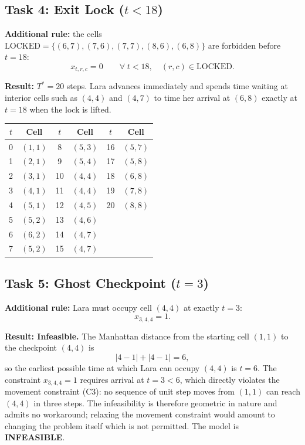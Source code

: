 \documentclass[12pt,a4paper]{article}
\begin{document}
\subsection*{Task 4: Exit Lock ($t<18$)}

\textbf{Additional rule:} the cells
$\mathrm{LOCKED}=\{(6,7),(7,6),(7,7),(8,6),(6,8)\}$
are forbidden before $t=18$:
\[
  x_{t,r,c}=0 \qquad \forall\;t<18,\quad(r,c)\in\mathrm{LOCKED}.
\]

\textbf{Result:} $T^*=20$ steps. Lara advances immediately and spends time waiting at
interior cells such as $(4,4)$ and $(4,7)$ to time her arrival at $(6,8)$ exactly at
$t=18$ when the lock is lifted.

\begin{center}
\begin{tabular}{cc|cc|cc}
\toprule
$t$ & Cell & $t$ & Cell & $t$ & Cell \\
\midrule
 0 & $(1,1)$ &  8 & $(5,3)$ & 16 & $(5,7)$ \\
 1 & $(2,1)$ &  9 & $(5,4)$ & 17 & $(5,8)$ \\
 2 & $(3,1)$ & 10 & $(4,4)$ & 18 & $(6,8)$ \\
 3 & $(4,1)$ & 11 & $(4,4)$ & 19 & $(7,8)$ \\
 4 & $(5,1)$ & 12 & $(4,5)$ & 20 & $(8,8)$ \\
 5 & $(5,2)$ & 13 & $(4,6)$ &    & \\
 6 & $(6,2)$ & 14 & $(4,7)$ &    & \\
 7 & $(5,2)$ & 15 & $(4,7)$ &    & \\
\bottomrule
\end{tabular}
\end{center}

\subsection*{Task 5: Ghost Checkpoint ($t=3$)}

\textbf{Additional rule:} Lara must occupy cell $(4,4)$ at exactly $t=3$:
\[
  x_{3,4,4}=1.
\]

\textbf{Result: Infeasible.} The Manhattan distance from the starting cell $(1,1)$ to the
checkpoint $(4,4)$ is
\[
  |4-1|+|4-1|=6,
\]
so the earliest possible time at which Lara can occupy $(4,4)$ is $t=6$. The constraint
$x_{3,4,4}=1$ requires arrival at $t=3<6$, which directly violates the movement
constraint (C3): no sequence of unit step moves from $(1,1)$ can reach $(4,4)$ in three
steps. The infeasibility is therefore geometric in nature and admits no workaround;
relaxing the movement constraint would amount to changing the problem itself which is
not permitted. The model is \textbf{INFEASIBLE}.
\end{document}
